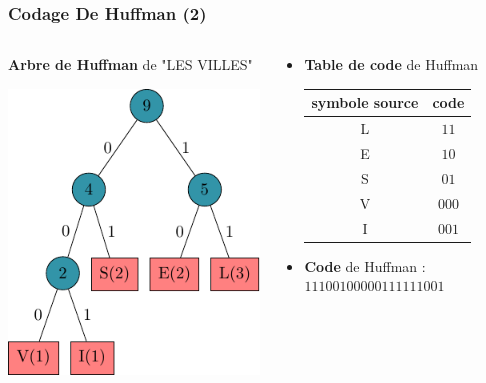 \documentclass{beamer}
\begin{document}
\begin{frame}
    \frametitle{Codage De Huffman (2)}

    \begin{columns}

        \begin{column}{0.5\textwidth}
            \textbf{Arbre de Huffman} de "LES VILLES"

            \vspace*{2em}

            \includegraphics{img/huffmanExample/huffmanExample.pdf}
        \end{column}

        \begin{column}{0.5\textwidth}
            \centering

            \begin{itemize}
                \item \textbf{Table de code} de Huffman

            \vspace*{1em}

            \begin{tabular}{c | c}
                symbole source & code \\
                \hline
                L & $11$ \\
                E & $10$ \\
                S & $01$ \\
                V & $000$ \\
                I & $001$ \\ \hline
            \end{tabular}
            
            \vspace*{2em}

            \item \textbf{Code} de Huffman : $11100100000111111001$
        \end{itemize}

        \end{column}
    \end{columns}
\end{frame}
\end{document}
